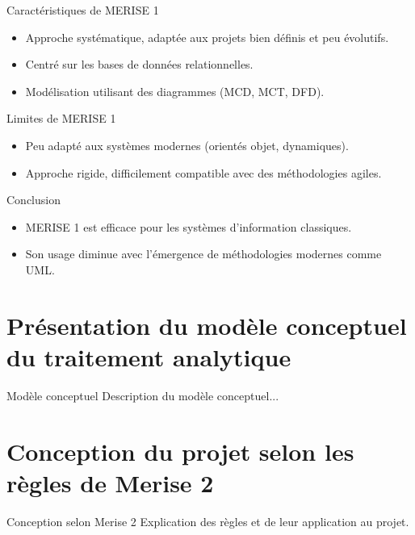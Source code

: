 \documentclass{beamer}
\begin{document}
\begin{frame}{Caractéristiques de MERISE 1}
\begin{itemize}
    \item Approche systématique, adaptée aux projets bien définis et peu évolutifs.
    \item Centré sur les bases de données relationnelles.
    \item Modélisation utilisant des diagrammes (MCD, MCT, DFD).
\end{itemize}
\end{frame}

\begin{frame}{Limites de MERISE 1}
\begin{itemize}
    \item Peu adapté aux systèmes modernes (orientés objet, dynamiques).
    \item Approche rigide, difficilement compatible avec des méthodologies agiles.
\end{itemize}
\end{frame}

\begin{frame}{Conclusion}
\begin{itemize}
    \item MERISE 1 est efficace pour les systèmes d’information classiques.
    \item Son usage diminue avec l'émergence de méthodologies modernes comme UML.
\end{itemize}
\end{frame}
\section{Présentation du modèle conceptuel du traitement analytique}
\begin{frame}{Modèle conceptuel}
    Description du modèle conceptuel...
\end{frame}



\section{Conception du projet selon les règles de Merise 2}
\begin{frame}{Conception selon Merise 2}
    Explication des règles et de leur application au projet.
\end{frame}
\end{document}

